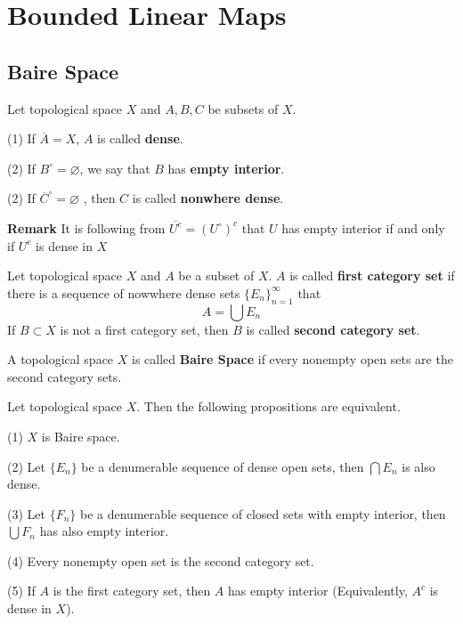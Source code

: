 \documentclass[12pt, oneside]{book}
\begin{document}
\chapter{Bounded Linear Maps}

\section{Baire Space}



\begin{definition}
    Let topological space $X$ and $A,B,C$ be subsets of $X$.


    (1) If $\overline{A}=X$, $A$ is called \textbf{dense}.

    (2) If $B^\circ = \varnothing$, we say that $B$ has \textbf{empty interior}.

    (2) If $\overline{C}^\circ = \varnothing$
    , then $C$ is called \textbf{nonwhere dense}.

    \textbf{Remark} It is following from
    $\overline{U^c}=
        \left(U^\circ\right)^c$ that $U$ has empty interior if and only if $U^c$ is dense in $X$
\end{definition}



\begin{definition}
    Let topological space $X$ and $A$ be a subset of $X$. $A$ is called \textbf{first category set} if there is a sequence of nowwhere dense sets $\{E_n\}_{n=1}^{\infty}$ that
    \begin{equation*}
        A
        =
        \bigcup E_n
    \end{equation*}
    If $B\subset X$ is not a first category set, then $B$ is called \textbf{second category set}.
\end{definition}

\begin{definition}
    A topological space $X$ is called \textbf{Baire Space} if every nonempty open sets are the second category sets.
\end{definition}

\begin{proposition}
    Let topological space $X$. Then the following propositions are equivalent.

    (1) $X$ is Baire space.

    (2) Let $\{E_n\}$ be a denumerable sequence of dense open sets, then $\bigcap E_n$ is also dense.

    (3) Let $\{F_n\}$ be a denumerable sequence of closed sets with empty interior, then $\bigcup F_n$ has also empty interior.

    (4) Every nonempty open set is the second category set.

    (5) If $A$ is the first category set, then $A$ has empty interior (Equivalently, $A^c$ is dense in $X$).
\end{proposition}
\end{document}
